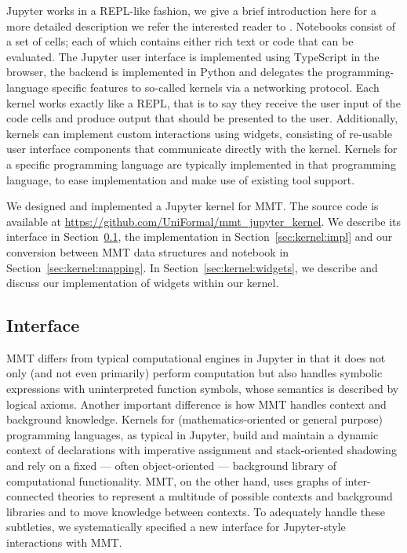 Jupyter works in a REPL-like fashion, we give a brief introduction here for a more detailed description we refer the interested reader to . 
Notebooks consist of a set of cells; each of which contains either rich text or code that can be evaluated. 
The Jupyter user interface is implemented using TypeScript in the browser, the backend is implemented in Python and delegates the programming-language specific features to so-called kernels via a networking protocol. 
Each kernel works exactly like a REPL, that is to say they receive the user input of the code cells and produce output that should be presented to the user. 
Additionally, kernels can implement custom interactions using widgets, consisting of re-usable user interface components that communicate directly with the kernel.  
Kernels for a specific programming language are typically implemented in that programming language, to ease implementation and make use of existing tool support. 

We designed and implemented a Jupyter kernel for MMT. 
The source code is available at \url{https://github.com/UniFormal/mmt_jupyter_kernel}. 
We describe its interface in Section~\ref{sec:kernel:syntax}, the implementation in Section~\ref{sec:kernel:impl} and our conversion between MMT data structures and notebook in Section~\ref{sec:kernel:mapping}.
In Section~\ref{sec:kernel:widgets}, we describe and discuss our implementation of widgets within our kernel. 

\subsection{Interface}\label{sec:kernel:syntax}

MMT differs from typical computational engines in Jupyter in that it does not only (and not even primarily) perform computation but also handles symbolic expressions with uninterpreted function symbols, whose semantics is described by logical axioms.
Another important difference is how MMT handles context and background knowledge.
Kernels for (mathematics-oriented or general purpose) programming languages, as typical in Jupyter, build and maintain a dynamic context of declarations with imperative assignment and stack-oriented shadowing and rely on a fixed --- often object-oriented --- background library of computational functionality.
MMT, on the other hand, uses graphs of inter-connected theories to represent a multitude of possible contexts and background libraries and to move knowledge between contexts.
To adequately handle these subtleties, we systematically specified a new interface for Jupyter-style interactions with MMT.

